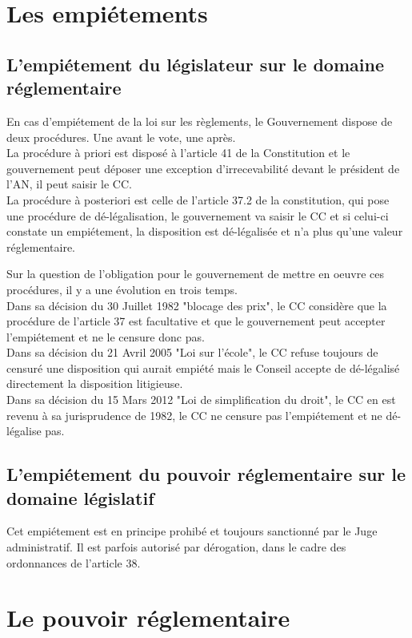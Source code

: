 \documentclass[10pt, a4paper, openany]{book}
\begin{document}
\section{Les empiétements}

\subsection{L'empiétement du législateur sur le domaine réglementaire}

En cas d'empiétement de la loi sur les règlements, le Gouvernement dispose de deux procédures. Une avant le vote, une après. \\
La procédure à priori est disposé à l'article 41 de la Constitution et le gouvernement peut déposer une exception d'irrecevabilité devant le président de l'AN, il peut saisir le CC. \\
La procédure à posteriori est celle de l'article 37.2 de la constitution, qui pose une procédure de dé-légalisation, le gouvernement va saisir le CC et si celui-ci constate un empiétement, la disposition est dé-légalisée et n'a plus qu'une valeur réglementaire.


Sur la question de l'obligation pour le gouvernement de mettre en oeuvre ces procédures, il y a une évolution en trois temps. \\
Dans sa décision du 30 Juillet 1982 "blocage des prix", le CC considère que la procédure de l'article 37 est facultative et que le gouvernement peut accepter l'empiétement et ne le censure donc pas. \\
Dans sa décision du 21 Avril 2005 "Loi sur l'école", le CC refuse toujours de censuré une disposition qui aurait empiété mais le Conseil accepte de dé-légalisé directement la disposition litigieuse. \\
Dans sa décision du 15 Mars 2012 "Loi de simplification du droit", le CC en est revenu à sa jurisprudence de 1982, le CC ne censure pas l'empiétement et ne dé-légalise pas. 

\subsection{L'empiétement du pouvoir réglementaire sur le domaine législatif}

Cet empiétement est en principe prohibé et toujours sanctionné par le Juge administratif. Il est parfois autorisé par dérogation, dans le cadre des ordonnances de l'article 38. 

\section{Le pouvoir réglementaire}
\end{document}
